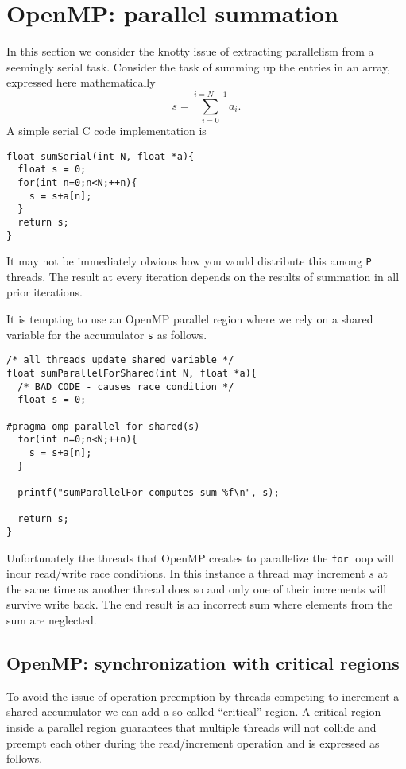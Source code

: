 \section{OpenMP: parallel summation}

In this section we consider the knotty issue of extracting parallelism from a seemingly serial task. Consider the task of summing up the entries in an array, expressed here mathematically
\[
s = \sum_{i=0}^{i=N-1} a_i.
\]
A simple serial C code implementation is
\begin{verbatim}
float sumSerial(int N, float *a){
  float s = 0;
  for(int n=0;n<N;++n){
    s = s+a[n];
  }
  return s;
}
\end{verbatim}
It may not be immediately obvious how you would distribute this among \texttt{P} threads. The result at every iteration depends on the results of summation in all prior iterations.  

It is tempting to use an OpenMP parallel region where we rely on a shared variable for the accumulator \texttt{s} as follows.

\begin{verbatim}
/* all threads update shared variable */
float sumParallelForShared(int N, float *a){
  /* BAD CODE - causes race condition */
  float s = 0;

#pragma omp parallel for shared(s)
  for(int n=0;n<N;++n){
    s = s+a[n];
  }

  printf("sumParallelFor computes sum %f\n", s);

  return s;
}
\end{verbatim}

Unfortunately the threads that OpenMP creates to parallelize the \texttt{for} loop will incur read/write race conditions. In this instance a thread may increment $s$ at the same time as another thread does so and only one of their increments will survive write back. The end result is an incorrect sum where elements from the sum are neglected.

\subsection{OpenMP: synchronization with critical regions}

To avoid the issue of operation preemption by threads competing to increment a shared accumulator we can add a so-called ``critical'' region. A critical region inside a parallel region guarantees that multiple threads will not collide and preempt each other during the read/increment operation and is expressed as follows.

